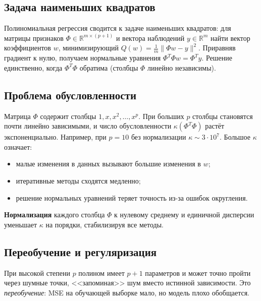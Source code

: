 \documentclass[12pt]{article}
\begin{document}
\subsection{Задача наименьших квадратов}

Полиномиальная регрессия сводится к задаче наименьших квадратов: для матрицы признаков $\Phi \in \mathbb{R}^{m \times (p+1)}$ и вектора наблюдений $y \in \mathbb{R}^m$ найти вектор коэффициентов $w$, минимизирующий $Q(w) = \frac{1}{m}\|\Phi w - y\|^2$. Приравняв градиент к нулю, получаем нормальные уравнения $\Phi^T \Phi w = \Phi^T y$. Решение единственно, когда $\Phi^T\Phi$ обратима (столбцы $\Phi$ линейно независимы).

\subsection{Проблема обусловленности}

Матрица $\Phi$ содержит столбцы $1, x, x^2, \ldots, x^p$. При больших $p$ столбцы становятся почти линейно зависимыми, и число обусловленности $\kappa(\Phi^T\Phi)$ растёт экспоненциально. Например, при $p=10$ без нормализации $\kappa \sim 3 \cdot 10^7$. Большое $\kappa$ означает:
\begin{itemize}
    \item малые изменения в данных вызывают большие изменения в $w$;
    \item итеративные методы сходятся медленно;
    \item решение нормальных уравнений теряет точность из-за ошибок округления.
\end{itemize}

\textbf{Нормализация} каждого столбца $\Phi$ к нулевому среднему и единичной дисперсии уменьшает $\kappa$ на порядки, стабилизируя все методы.

\subsection{Переобучение и регуляризация}

При высокой степени $p$ полином имеет $p+1$ параметров и может точно пройти через шумные точки, <<запоминая>> шум вместо истинной зависимости. Это \textit{переобучение}: MSE на обучающей выборке мало, но модель плохо обобщается.
\end{document}
